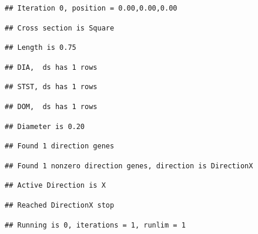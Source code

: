 \documentclass[]{article}
\begin{document}
\begin{verbatim}
## Iteration 0, position = 0.00,0.00,0.00
\end{verbatim}

\begin{verbatim}
## Cross section is Square
\end{verbatim}

\begin{verbatim}
## Length is 0.75
\end{verbatim}

\begin{verbatim}
## DIA,  ds has 1 rows
\end{verbatim}

\begin{verbatim}
## STST, ds has 1 rows
\end{verbatim}

\begin{verbatim}
## DOM,  ds has 1 rows
\end{verbatim}

\begin{verbatim}
## Diameter is 0.20
\end{verbatim}

\begin{verbatim}
## Found 1 direction genes
\end{verbatim}

\begin{verbatim}
## Found 1 nonzero direction genes, direction is DirectionX
\end{verbatim}

\begin{verbatim}
## Active Direction is X
\end{verbatim}

\begin{verbatim}
## Reached DirectionX stop
\end{verbatim}

\begin{verbatim}
## Running is 0, iterations = 1, runlim = 1
\end{verbatim}
\end{document}
